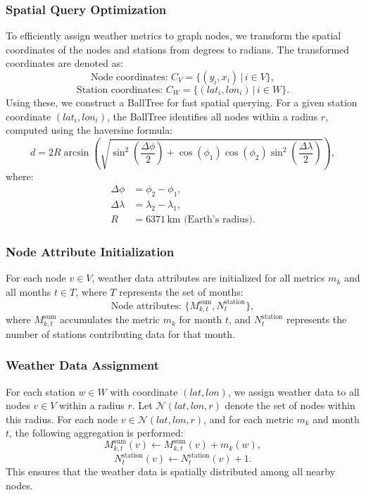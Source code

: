 \documentclass[sigplan,screen]{acmart}
\begin{document}
\subsubsection{Spatial Query Optimization}
To efficiently assign weather metrics to graph nodes, we transform the spatial coordinates of the nodes and stations from degrees to radians. The transformed coordinates are denoted as:
\[
\text{Node coordinates: } C_V = \{(y_i, x_i) \,|\, i \in V\},
\]
\[
\text{Station coordinates: } C_W = \{(lat_i, lon_i) \,|\, i \in W\}.
\]
Using these, we construct a BallTree for fast spatial querying. For a given station coordinate \( (lat_i, lon_i) \), the BallTree identifies all nodes within a radius \( r \), computed using the haversine formula:
\[
d = 2 R \arcsin \left( \sqrt{\sin^2\left(\frac{\Delta \phi}{2}\right) + \cos(\phi_1)\cos(\phi_2)\sin^2\left(\frac{\Delta \lambda}{2}\right)} \right),
\]
where:
\begin{align*}
\Delta \phi &= \phi_2 - \phi_1, \\
\Delta \lambda &= \lambda_2 - \lambda_1, \\
R &= 6371 \, \text{km (Earth's radius)}.
\end{align*}

\subsubsection{Node Attribute Initialization}
For each node \( v \in V \), weather data attributes are initialized for all metrics \( m_k \) and all months \( t \in T \), where \( T \) represents the set of months:
\[
\text{Node attributes: } \{M_{k,t}^\text{sum}, N_t^\text{station}\},
\]
where \(M_{k,t}^\text{sum}\) accumulates the metric \(m_k\) for month \(t\), and \(N_t^\text{station}\) represents the number of stations contributing data for that month.

\subsubsection{Weather Data Assignment}
For each station \( w \in W \) with coordinate \((lat, lon)\), we assign weather data to all nodes \( v \in V \) within a radius \( r \). Let \( \mathcal{N}(lat, lon, r) \) denote the set of nodes within this radius. For each node \( v \in \mathcal{N}(lat, lon, r) \), and for each metric \( m_k \) and month \( t \), the following aggregation is performed:
\[
M_{k,t}^\text{sum}(v) \leftarrow M_{k,t}^\text{sum}(v) + m_k(w),
\]
\[
N_t^\text{station}(v) \leftarrow N_t^\text{station}(v) + 1.
\]
This ensures that the weather data is spatially distributed among all nearby nodes.
\end{document}
